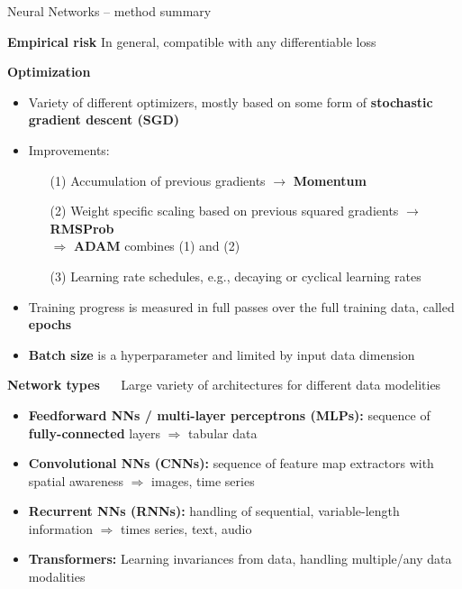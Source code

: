 \documentclass[11pt,compress,t,notes=noshow, xcolor=table]{beamer}
\newcommand{\highlight}[1]{\textcolor{hlcol}{\textbf{#1}}}
\begin{document}
\begin{frame2}{Neural Networks -- method summary}
  
  \highlight{Empirical risk} In general, compatible with any differentiable loss
  
  \medskip

  \framebreak
  
  \highlight{Optimization}
  
  \begin{itemize}
    \item Variety of different optimizers, mostly based on some form of 
    \textbf{stochastic gradient descent (SGD)}\\
    \item Improvements: 
      \begin{itemize}
          \item[(1)] Accumulation of previous gradients $\rightarrow$ \textbf{Momentum}
          \item[(2)] Weight specific scaling based on previous squared gradients $\rightarrow$ \textbf{RMSProb}\\
          $\Rightarrow$ \textbf{ADAM} combines (1) and (2) 
          \item[(3)] Learning rate schedules, e.g., decaying or cyclical learning rates
      \end{itemize}
      \item Training progress is measured in full passes over the full training data, called \textbf{epochs}
      \item \textbf{Batch size} is a hyperparameter and limited by input data dimension
  \end{itemize}

  \framebreak

  \highlight{Network types} ~~ Large variety of architectures for different data modelities
\begin{itemize}
  \item \textbf{Feedforward NNs / multi-layer perceptrons (MLPs):} sequence of 
  \textbf{fully-connected} layers $\Rightarrow$ tabular data
  \item \textbf{Convolutional NNs (CNNs):} sequence of feature map extractors 
  with spatial awareness $\Rightarrow$ images, time series
  \item \textbf{Recurrent NNs (RNNs):} handling of sequential, variable-length 
  information $\Rightarrow$ times series, text, audio
  \item \textbf{Transformers:} Learning invariances from data, handling multiple/any data modalities
\end{itemize}


\end{frame2}
\end{document}

